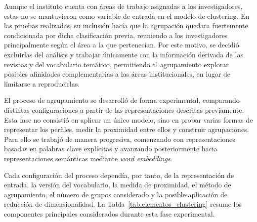 \documentclass[11pt,spanish,listoffigures,listoftables]{tfgetsinf}
\begin{document}
Aunque el instituto cuenta con áreas de trabajo asignadas a los investigadores, estas no se mantuvieron como variable de entrada en el modelo de clustering. En las pruebas realizadas, su inclusión hacía que la agrupación quedara fuertemente condicionada por dicha clasificación previa, reuniendo a los investigadores principalmente según el área a la que pertenecían. Por este motivo, se decidió excluirlas del análisis y trabajar únicamente con la información derivada de las revistas y del vocabulario temático, permitiendo al agrupamiento explorar posibles afinidades complementarias a las áreas institucionales, en lugar de limitarse a reproducirlas.

El proceso de agrupamiento se desarrolló de forma experimental, comparando distintas configuraciones a partir de las representaciones descritas previamente. Esta fase no consistió en aplicar un único modelo, sino en probar varias formas de representar los perfiles, medir la proximidad entre ellos y construir agrupaciones. Para ello se trabajó de manera progresiva, comenzando con representaciones basadas en palabras clave explícitas y avanzando posteriormente hacia representaciones semánticas mediante \textit{word embeddings}.

Cada configuración del proceso dependía, por tanto, de la representación de entrada, la versión del vocabulario, la medida de proximidad, el método de agrupamiento, el número de grupos considerado y la posible aplicación de reducción de dimensionalidad. La Tabla~\ref{tab:elementos_clustering} resume los componentes principales considerados durante esta fase experimental.
\end{document}

